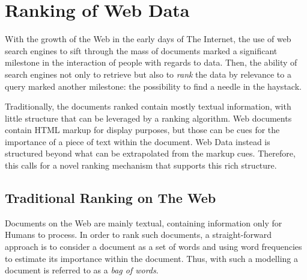 %
%

\section{Ranking of Web Data}
\label{chap1:introduction:ranking}

With the growth of the Web in the early days of The Internet, the use of web search engines to sift through the mass of documents marked a significant milestone in the interaction of people with regards to data. Then, the ability of search engines not only to retrieve but also to \emph{rank} the data by relevance to a query marked another milestone: the possibility to find a needle in the haystack.

Traditionally, the documents ranked contain mostly textual information, with little structure that can be leveraged by a ranking algorithm. Web documents contain HTML markup for display purposes, but those can be cues for the importance of a piece of text within the document. Web Data instead is structured beyond what can be extrapolated from the markup cues. Therefore, this calls for a novel ranking mechanism that supports this rich structure.

\subsection{Traditional Ranking on The Web}

Documents on the Web are mainly textual, containing information only for Humans to process. In order to rank such documents, a straight-forward approach is to consider a document as a set of words and using word frequencies to estimate its importance within the document. Thus, with such a modelling a document is referred to as a \emph{bag of words}.

